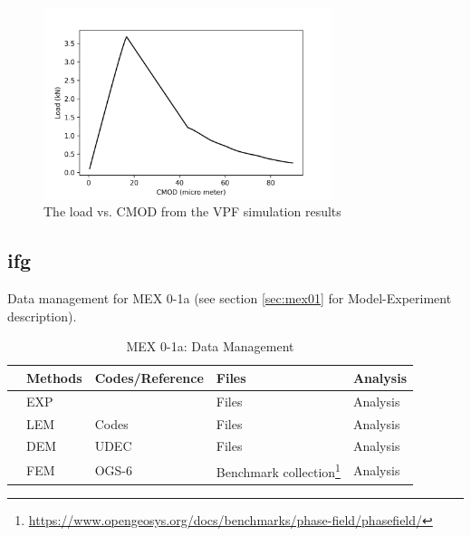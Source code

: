 \begin{figure}[!ht]
\centering
\includegraphics[width=0.75\textwidth]{figures/VPF_ME1_NF_CMOD.png}
\caption{The load vs. CMOD from the VPF simulation results}
\label{fig:Keita_ME1_VPF_Rockville}
\end{figure}

\subsection*{ifg}


Data management for MEX 0-1a (see section \ref{sec:mex01} for Model-Experiment description).


\begin{table}[h!]
\footnotesize
\centering
\caption{MEX 0-1a: Data Management}
\label{tab:schedule}
\begin{tabular}{|L{0.5cm}|L{1cm}|L{2cm}|L{3cm}|L{1cm}|} 
\hline
 & Methods & Codes/Reference & Files & Analysis \\ \hline
 & EXP & \cite{} & Files & Analysis \\ \hline
 & LEM & Codes & Files & Analysis \\ \hline
 & DEM & UDEC & Files & Analysis \\ \hline
 & FEM & OGS-6 & Benchmark collection\footnote{\url{https://www.opengeosys.org/docs/benchmarks/phase-field/phasefield/}} & Analysis \\ \hline
\end{tabular}
\end{table}
\normalsize

